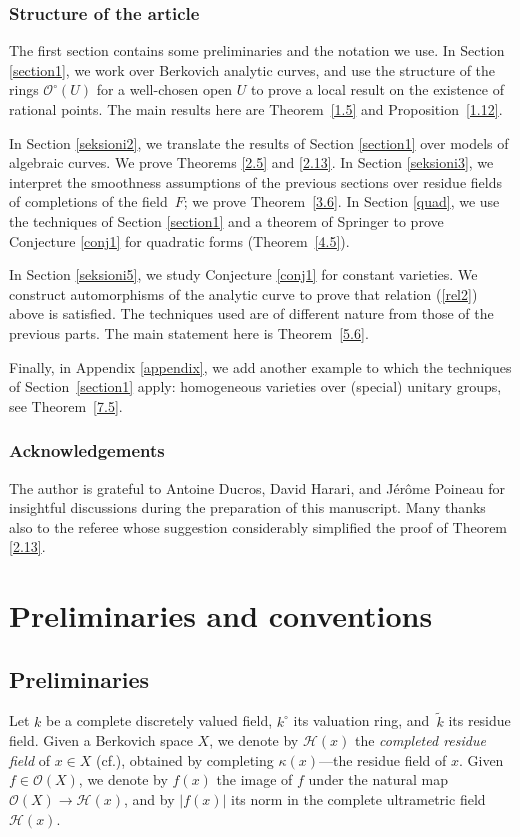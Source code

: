 \documentclass[10pt]{amsart}
\newcommand{\cf}{cf.}
\theoremstyle{definition}
\begin{document}
\subsubsection*{Structure of the article}
The first section contains some preliminaries and the notation we use. In Section \ref{section1}, we work over Berkovich analytic curves, and use the structure of the rings $\mathcal{O}^{\circ}(U)$ for a well-chosen open $U$ to prove a local result on the existence of rational points. The main results here are Theorem~\ref{1.5} and Proposition~\ref{1.12}.

In Section \ref{seksioni2}, we translate the results of Section \ref{section1} over models of algebraic curves. We prove Theorems \ref{2.5} and \ref{2.13}. In Section \ref{seksioni3}, we interpret the smoothness assumptions of the previous sections over residue fields of completions of the field~$F$; we prove Theorem~\ref{3.6}.
In Section \ref{quad}, we use the techniques of Section \ref{section1} and a theorem of Springer to prove Conjecture \ref{conj1} for quadratic forms (Theorem~\ref{4.5}).

In Section \ref{seksioni5}, we study Conjecture \ref{conj1} for constant varieties. We construct automorphisms of the analytic curve to prove that relation (\ref{rel2}) above is satisfied. The techniques used are of different nature from those of the previous parts. The main statement here is Theorem~\ref{5.6}.

Finally, in Appendix \ref{appendix}, we add another example to which the techniques of Section~\ref{section1} apply: homogeneous varieties over (special) unitary groups, see Theorem~\ref{7.5}.\enlargethispage{.5\baselineskip}%

\subsubsection*{Acknowledgements}
The author is grateful to Antoine Ducros, David Harari, and Jérôme Poineau for insightful discussions during the preparation of this manuscript. Many thanks also to the referee whose suggestion considerably simplified the proof of Theorem \ref{2.13}.

\section{Preliminaries and conventions}

\subsection{Preliminaries}
Let $k$ be a complete discretely valued field, $k^{\circ}$ its valuation ring, and~$\widetilde{k}$ its residue field. Given a Berkovich space $X$, we denote by $\mathcal{H}(x)$ the \emph{completed residue field} of $x \in X$ (\cf \cite[Rem.\,1.2.2]{Ber90}), obtained by completing $\kappa(x)$---the residue field of $x$. Given $f \in \mathcal{O}(X)$, we denote by $f(x)$ the image of $f$ under the natural map $\mathcal{O}(X) \to \mathcal{H}(x)$, and by $|f(x)|$ its norm in the complete ultrametric field~$\mathcal{H}(x)$.
\end{document}
